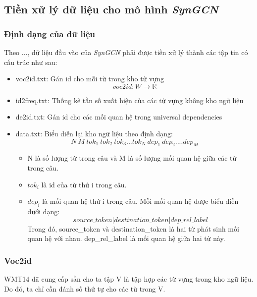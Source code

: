 {\subsection{Tiền xử lý dữ liệu cho mô hình \textit{SynGCN}}

\subsubsection{Định dạng của dữ liệu}

Theo ..., dữ liệu đầu vào của \textit{SynGCN} phải được tiền xử lý thành các tập tin có cấu trúc như sau:
\begin{itemize}
	\item voc2id.txt: Gán id cho mỗi từ trong kho từ vựng
	\begin{equation*}
		voc2id: W \rightarrow \mathbb{R}
	\end{equation*}
	\item id2freq.txt: Thống kê tần số xuất hiện của các từ vựng không kho ngữ liệu
	\item de2id.txt: Gán id cho các mối quan hệ trong universal dependencies
	\item data.txt: Biểu diễn lại kho ngữ liệu theo định dạng:
	\begin{equation*}
	N\ M\ tok_1\ tok_2\ tok_3 ... tok_N\ dep_1\ dep_2 .... dep_M
	\end{equation*}
	\begin{itemize}
		\item N là số lượng từ trong câu và M là số lượng mối quan hệ giữa các từ trong câu.
		\item $tok_i$ là id của từ thứ i trong câu.
		\item $dep_i$ là mối quan hệ thứ i trong câu. Mỗi mối quan hệ được biểu diễn dưới dạng:
		\begin{equation*}
			source\_token|destination\_token|dep\_rel\_label
		\end{equation*}
		Trong đó, source\_token và destination\_token là hai từ phát sinh mối quan hệ với nhau. dep\_rel\_label là mối quan hệ giữa hai từ này.
	\end{itemize}
\end{itemize}

\subsubsection{Voc2id}

WMT14 đã cung cấp sẵn cho ta tập V là tập hợp các từ vựng trong kho ngữ liệu. Do đó, ta chỉ cần đánh số thứ tự cho các từ trong V.

}
